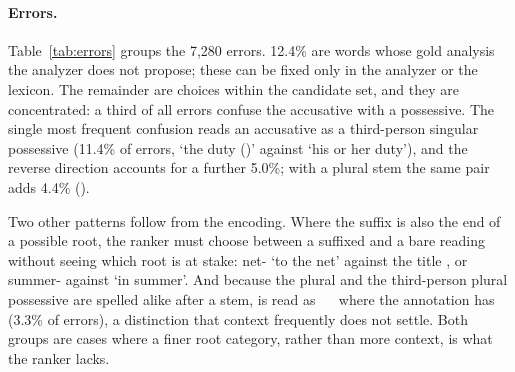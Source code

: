 \paragraph{Errors.}
Table~\ref{tab:errors} groups the 7,280 errors. 12.4\% are words whose gold analysis the analyzer does not propose; these can be fixed only in the analyzer or the lexicon. The remainder are choices within the candidate set, and they are concentrated: a third of all errors confuse the accusative with a possessive. The single most frequent confusion reads an accusative as a third-person singular possessive (11.4\% of errors,  `the duty ()' against  `his or her duty'), and the reverse direction accounts for a further 5.0\%; with a plural stem the same pair adds 4.4\% ().

Two other patterns follow from the encoding. Where the suffix is also the end of a possible root, the ranker must choose between a suffixed and a bare reading without seeing which root is at stake:  net- `to the net' against the title , or  summer- against  `in summer'. And because the plural and the third-person plural possessive are spelled alike after a stem,  is read as ~~ where the annotation has  (3.3\% of errors), a distinction that context frequently does not settle. Both groups are cases where a finer root category, rather than more context, is what the ranker lacks.
